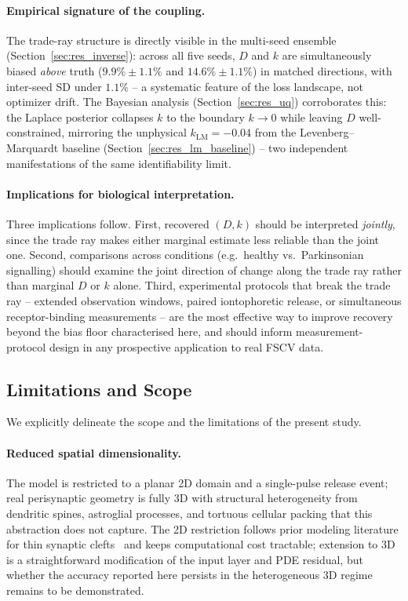 \documentclass[12pt]{article}
\begin{document}
\paragraph{Empirical signature of the coupling.}
\label{sec:lim_coupling}
The trade-ray structure is directly visible in the multi-seed
ensemble (Section~\ref{sec:res_inverse}): across all five seeds,
$D$ and $k$ are simultaneously biased \emph{above} truth
($9.9\% \pm 1.1\%$ and $14.6\% \pm 1.1\%$) in matched
directions, with inter-seed SD under $1.1\%$ -- a systematic
feature of the loss landscape, not optimizer drift. The Bayesian
analysis (Section~\ref{sec:res_uq}) corroborates this: the
Laplace posterior collapses $k$ to the boundary $k \to 0$ while
leaving $D$ well-constrained, mirroring the unphysical
$k_{\mathrm{LM}} = -0.04$ from the Levenberg--Marquardt baseline
(Section~\ref{sec:res_lm_baseline}) -- two independent
manifestations of the same identifiability limit.

\paragraph{Implications for biological interpretation.}
Three implications follow. First, recovered $(D, k)$ should be
interpreted \emph{jointly}, since the trade ray makes either
marginal estimate less reliable than the joint one. Second,
comparisons across conditions (e.g.\ healthy vs.\ Parkinsonian
signalling) should examine the joint direction of change along
the trade ray rather than marginal $D$ or $k$ alone. Third,
experimental protocols that break the trade ray -- extended
observation windows, paired iontophoretic release, or
simultaneous receptor-binding measurements -- are the most
effective way to improve recovery beyond the bias floor
characterised here, and should inform measurement-protocol
design in any prospective application to real FSCV data.

\subsection{Limitations and Scope}
\label{sec:limitations}

We explicitly delineate the scope and the limitations of the
present study.

\paragraph{Reduced spatial dimensionality.}
The model is restricted to a planar 2D domain and a
single-pulse release event; real perisynaptic geometry is
fully 3D with structural heterogeneity from dendritic spines,
astroglial processes, and tortuous cellular packing that this
abstraction does not capture. The 2D restriction follows prior
modeling literature for thin synaptic clefts~\cite{Wiencke2020}
and keeps computational cost tractable; extension to 3D is a
straightforward modification of the input layer and PDE
residual, but whether the accuracy reported here persists in
the heterogeneous 3D regime remains to be demonstrated.
\end{document}
